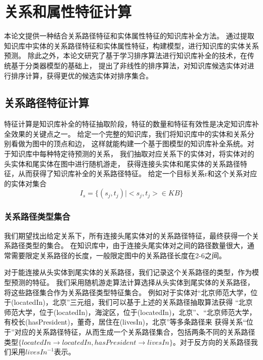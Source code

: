 

\chapter{关系和属性特征计算}
\label{cha:kbc-lit-relation}
本论文提供一种结合关系路径特征和实体属性特征的知识库补全方法。
通过提取知识库中实体的关系路径特征和实体属性特征，构建模型，进行知识库的实体关系预测。
除此之外，本论文研究了基于学习排序算法进行知识库补全的技术，在传统基于分类器模型的基础上，
提出了非线性的排序算法，对知识库候选实体对进行排序计算，获得更优的候选实体对排序集合。

\section{关系路径特征计算}
\label{sec:relational-compute}
特征计算是知识库补全的特征抽取阶段，特征的数量和特征有效性是决定知识库补全效果的关键点之一。
给定一个完整的知识库，我们将知识库中的实体和关系分别看做为图中的顶点和边，
这样就能构建一个基于图模型的知识库补全系统。对于知识库中每种特定待预测的关系，
我们抽取对应关系下的实体对，将实体对的头实体和尾实体在图中进行随机游走\cite{Lao2012}，
获得连接头实体和尾实体的关系路径特征，从而获得了知识库补全的关系路径特征。
给定一个目标关系r和这个关系对应的实体对集合
$$I_s=\{(s_j,t_j)|<s_j,t_j> \in KB\}$$


\subsection{关系路径类型集合}
\label{sec:relational-set}
我们期望找出给定关系下，所有连接头尾实体对的关系路径特征，最终获得一个关系路径类型的集合。
在知识库中，由于连接头尾实体对之间的路径数量很大，通常需要限定关系路径的长度，一般限定图中的关系路径长度在2-6之间。

对于能连接从头实体到尾实体的关系路径，我们记录这个关系路径的类型，作为模型预测的特征。
我们采用随机游走算法\cite{Lovsz1993RandomWO}计算选择从头实体到尾实体的关系路径，将这些路径集合作为关系路径类型特征集合。
例如对于实体对“北京师范大学，位于(locatedIn)，北京”三元组，我们可以基于上述的关系路径抽取算法获得
“北京师范大学，位于(locatedIn)，海淀区，位于(locatedIn)，北京”、“北京师范大学，有校长(hasPresident)，董奇，居住在(livesIn)，北京”等多条路径来
获得关系“位于”对应的关系路径特征，从而生成一个关系路径集合，包括两条不同的关系路径类型$\{locatedIn\to locatedIn, hasPresident \to livesIn\}$。对于反方向的关系路径我们采用${livesIn}^{-1}$表示。

